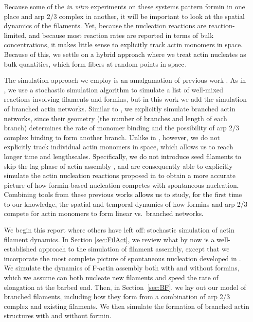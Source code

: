 \documentclass[11pt]{article}
\begin{document}
Because some of the \emph{in vitro} experiments on these systems pattern formin in one place and arp 2/3 complex in another, it will be important to look at the spatial dynamics of the filaments. Yet, because the nucleation reactions are reaction-limited, and because most reaction rates are reported in terms of bulk concentrations, it makes little sense to explicitly track actin monomers in space. Because of this, we settle on a hybrid approach where we treat actin nucleates as bulk quantities, which form fibers at random points in space. %

The simulation approach we employ is an amalgamation of previous work \cite{fass2008stochastic, ni2019turnover, banerjee2022emergence}. As in \cite{fass2008stochastic, banerjee2022emergence}, we use a stochastic simulation algorithm to simulate a list of well-mixed reactions involving filaments and formins, but in this work we add the simulation of branched actin networks. Similar to \cite{ni2019turnover, liman2020role}, we explicitly simulate branched actin networks, since their geometry (the number of branches and length of each branch) determines the rate of monomer binding and the possibility of arp 2/3 complex binding to form another branch. Unlike in \cite{ni2019turnover}, however, we do not explicitly track individual actin monomers in space, which allows us to reach longer time and lengthscales. Specifically, we do not introduce seed filaments to skip the lag phase of actin assembly \cite{chandrasekaran2022nucleation}, and are consequently able to explicitly simulate the actin nucleation reactions proposed in \cite{rosenbloom2021mechanism} to obtain a more accurate picture of how formin-based nucleation competes with spontaneous nucleation. Combining tools from these previous works allows us to study, for the first time to our knowledge, the spatial and temporal dynamics of how formins and arp 2/3 compete for actin monomers to form linear vs.\ branched networks.

We begin this report where others have left off: stochastic simulation of actin filament dynamics. In Section \ref{sec:FilAct}, we review what by now is a well-established approach to the simulation of filament assembly, except that we incorporate the most complete picture of spontaneous nucleation developed in \cite{rosenbloom2021mechanism}. We simulate the dynamics of F-actin assembly both with and without formins, which we assume can both nucleate new filaments and speed the rate of elongation at the barbed end. Then, in Section\ \ref{sec:BF}, we lay out our model of branched filaments, including how they form from a combination of arp 2/3 complex and existing filaments. We then simulate the formation of branched actin structures with and without formin.
\end{document}
